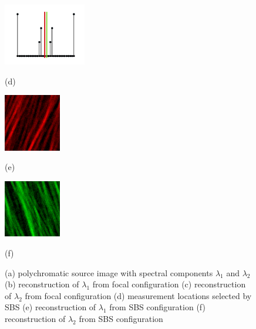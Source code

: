 \documentclass{article}
\begin{document}
\begin{figure}[t]
\begin{minipage}[b]{0.32\linewidth}
  \centering
  \centerline{\includegraphics[width=3.6cm]{csbs_copies}}
  \centerline{(d)}
\end{minipage}
\begin{minipage}[b]{0.32\linewidth}
  \centering
  \centerline{\includegraphics[width=2.5cm]{recon_csbs1}}
  \centerline{(e)}
\end{minipage}
\begin{minipage}[b]{0.32\linewidth}
  \centering
  \centerline{\includegraphics[width=2.5cm]{recon_csbs2}}
  \centerline{(f)}
\end{minipage}
\caption{(a) polychromatic source image with spectral components $\lambda_1$ and
  $\lambda_2$ (b) reconstruction of $\lambda_1$ from focal configuration (c)
  reconstruction of $\lambda_2$ from focal configuration (d) measurement
  locations selected by SBS (e) reconstruction of
  $\lambda_1$ from SBS configuration (f) reconstruction of $\lambda_2$ from
  SBS configuration}
\label{fig:results}
\end{figure}
\end{document}

